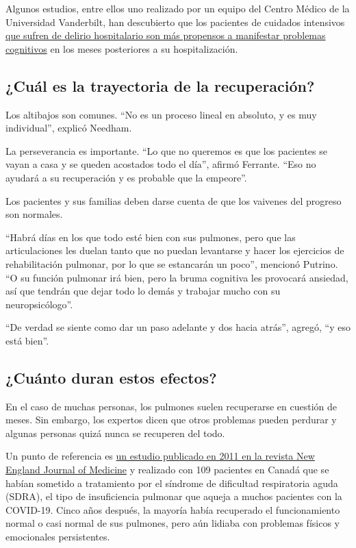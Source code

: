 Algunos estudios, entre ellos uno realizado por un equipo del Centro
Médico de la Universidad Vanderbilt, han descubierto que los pacientes
de cuidados intensivos
\href{https://www.nejm.org/doi/full/10.1056/NEJMoa1301372}{que sufren de
delirio hospitalario son más propensos a manifestar problemas
cognitivos} en los meses posteriores a su hospitalización.

\hypertarget{cuuxe1l-es-la-trayectoria-de-la-recuperaciuxf3n}{%
\subsection{¿Cuál es la trayectoria de la
recuperación?}\label{cuuxe1l-es-la-trayectoria-de-la-recuperaciuxf3n}}

Los altibajos son comunes. ``No es un proceso lineal en absoluto, y es
muy individual'', explicó Needham.

La perseverancia es importante. ``Lo que no queremos es que los
pacientes se vayan a casa y se queden acostados todo el día'', afirmó
Ferrante. ``Eso no ayudará a su recuperación y es probable que la
empeore''.

Los pacientes y sus familias deben darse cuenta de que los vaivenes del
progreso son normales.

``Habrá días en los que todo esté bien con sus pulmones, pero que las
articulaciones les duelan tanto que no puedan levantarse y hacer los
ejercicios de rehabilitación pulmonar, por lo que se estancarán un
poco'', mencionó Putrino. ``O su función pulmonar irá bien, pero la
bruma cognitiva les provocará ansiedad, así que tendrán que dejar todo
lo demás y trabajar mucho con su neuropsicólogo''.

``De verdad se siente como dar un paso adelante y dos hacia atrás'',
agregó, ``y eso está bien''.

\hypertarget{cuuxe1nto-duran-estos-efectos}{%
\subsection{¿Cuánto duran estos
efectos?}\label{cuuxe1nto-duran-estos-efectos}}

En el caso de muchas personas, los pulmones suelen recuperarse en
cuestión de meses. Sin embargo, los expertos dicen que otros problemas
pueden perdurar y algunas personas quizá nunca se recuperen del todo.

Un punto de referencia es
\href{https://www.nejm.org/doi/full/10.1056/nejmoa1011802}{un estudio
publicado en 2011 en la revista New England Journal of Medicine} y
realizado con 109 pacientes en Canadá que se habían sometido a
tratamiento por el síndrome de dificultad respiratoria aguda (SDRA), el
tipo de insuficiencia pulmonar que aqueja a muchos pacientes con la
COVID-19. Cinco años después, la mayoría había recuperado el
funcionamiento normal o casi normal de sus pulmones, pero aún lidiaba
con problemas físicos y emocionales persistentes.

